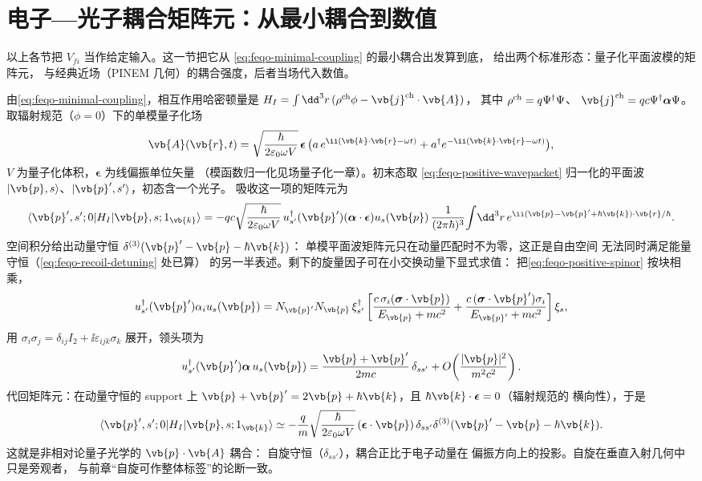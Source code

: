 \section{电子—光子耦合矩阵元：从最小耦合到数值}
\label{sec:feqo-coupling-matrix-element}

以上各节把 \(V_{fi}\) 当作给定输入。这一节把它从
\cref{eq:feqo-minimal-coupling} 的最小耦合出发算到底，
给出两个标准形态：量子化平面波模的矩阵元，
与经典近场（PINEM 几何）的耦合强度，后者当场代入数值。

由\cref{eq:feqo-minimal-coupling}，相互作用哈密顿量是
\(H_I=\int\dd^3r\,(\rho^{\rm ch}\phi-\vb{j}^{\rm ch}\cdot\vb{A})\)，
其中 \(\rho^{\rm ch}=q\Psi^\dagger\Psi\)、
\(\vb{j}^{\rm ch}=qc\Psi^\dagger\boldsymbol\alpha\Psi\)。
取辐射规范（\(\phi=0\)）下的单模量子化场
\[
\vb{A}(\vb{r},t)=\sqrt{\frac{\hbar}{2\varepsilon_0\omega V}}\,
\boldsymbol\epsilon\,
\bigl(a\,e^{\ii(\vb{k}\cdot\vb{r}-\omega t)}
+a^\dagger e^{-\ii(\vb{k}\cdot\vb{r}-\omega t)}\bigr),
\]
\(V\) 为量子化体积，\(\boldsymbol\epsilon\) 为线偏振单位矢量
（模函数归一化见场量子化一章）。初末态取
\cref{eq:feqo-positive-wavepacket} 归一化的平面波
\(|\vb{p},s\rangle\)、\(|\vb{p}',s'\rangle\)，初态含一个光子。
吸收这一项的矩阵元为
\[
\langle\vb{p}',s';0|H_I|\vb{p},s;1_{\vb{k}}\rangle
=-qc\sqrt{\frac{\hbar}{2\varepsilon_0\omega V}}\,
u_{s'}^\dagger(\vb{p}')(\boldsymbol\alpha\cdot\boldsymbol\epsilon)
u_s(\vb{p})\,
\frac{1}{(2\pi\hbar)^3}\!\int\!\dd^3r\,
e^{\ii(\vb{p}-\vb{p}'+\hbar\vb{k})\cdot\vb{r}/\hbar}.
\]
空间积分给出动量守恒
\(\delta^{(3)}(\vb{p}'-\vb{p}-\hbar\vb{k})\)：
单模平面波矩阵元只在动量匹配时不为零，这正是自由空间
无法同时满足能量守恒（\cref{eq:feqo-recoil-detuning} 处已算）
的另一半表述。剩下的旋量因子可在小交换动量下显式求值：
把\cref{eq:feqo-positive-spinor} 按块相乘，
\[
u_{s'}^\dagger(\vb{p}')\alpha_iu_s(\vb{p})
=N_{\vb{p}'}N_{\vb{p}}\,\xi_{s'}^\dagger
\left[\frac{c\,\sigma_i(\boldsymbol\sigma\cdot\vb{p})}
{E_{\vb{p}}+mc^2}
+\frac{c\,(\boldsymbol\sigma\cdot\vb{p}')\sigma_i}
{E_{\vb{p}'}+mc^2}\right]\xi_s ,
\]
用 \(\sigma_i\sigma_j=\delta_{ij}I_2+\ii\varepsilon_{ijk}\sigma_k\)
展开，领头项为
\[
u_{s'}^\dagger(\vb{p}')\boldsymbol\alpha\,u_s(\vb{p})
=\frac{\vb{p}+\vb{p}'}{2mc}\,\delta_{ss'}
+O\!\left(\frac{|\vb{p}|^2}{m^2c^2}\right).
\]
代回矩阵元：在动量守恒的 support 上
\(\vb{p}+\vb{p}'=2\vb{p}+\hbar\vb{k}\)，且
\(\hbar\vb{k}\cdot\boldsymbol\epsilon=0\)（辐射规范的
横向性），于是
\[
\langle\vb{p}',s';0|H_I|\vb{p},s;1_{\vb{k}}\rangle
\simeq-\frac{q}{m}\sqrt{\frac{\hbar}{2\varepsilon_0\omega V}}\,
(\boldsymbol\epsilon\cdot\vb{p})\,
\delta_{ss'}\delta^{(3)}(\vb{p}'-\vb{p}-\hbar\vb{k}).
\]
这就是非相对论量子光学的 \(\vb{p}\cdot\vb{A}\) 耦合：
自旋守恒（\(\delta_{ss'}\)），耦合正比于电子动量在
偏振方向上的投影。自旋在垂直入射几何中只是旁观者，
与前章“自旋可作整体标签”的论断一致。


